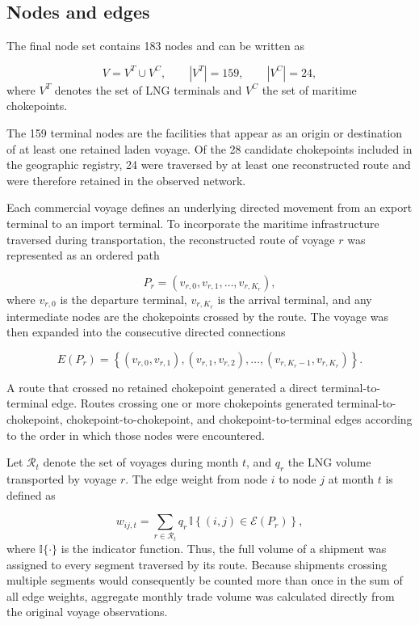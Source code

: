\documentclass[pdftex,12pt,openright,a4paper,oneside]{book}
\begin{document}
\subsection{Nodes and edges} 
\label{subsec:nodes_edges} 
The final node set contains 183 nodes and can be written as 

\begin{equation*} 
    V = V^{T} \cup V^{C}, \qquad |V^{T}|=159, \qquad |V^{C}|=24, 
\end{equation*}
where \(V^{T}\) denotes the set of LNG terminals and \(V^{C}\) the set of maritime chokepoints. 

The 159 terminal nodes are the facilities that appear as an origin or destination of at least one retained laden voyage. 
Of the 28 candidate chokepoints included in the geographic registry, 24 were traversed by at least one reconstructed route and were therefore retained in the observed network.

Each commercial voyage defines an underlying directed movement from an export terminal to an import terminal. 
To incorporate the maritime infrastructure traversed during transportation, the reconstructed route of voyage \(r\) was represented as an ordered path 

\begin{equation*} 
    P_r = \left( v_{r,0},v_{r,1},\ldots,v_{r,K_r} \right), 
\end{equation*}
where \(v_{r,0}\) is the departure terminal, \(v_{r,K_r}\) is the arrival terminal, and any intermediate nodes are the chokepoints crossed by the route. 
The voyage was then expanded into the consecutive directed connections

\begin{equation*} 
    E(P_r)=\left\{(v_{r,0},v_{r,1}), (v_{r,1},v_{r,2}), \ldots, (v_{r,K_r-1},v_{r,K_r})\right\}. 
\end{equation*} 

A route that crossed no retained chokepoint generated a direct terminal-to-terminal edge. 
Routes crossing one or more chokepoints generated terminal-to-chokepoint, chokepoint-to-chokepoint, and chokepoint-to-terminal edges according to the order in which those nodes were encountered.

Let \(\mathcal{R}_t\) denote the set of voyages during month \(t\), and \(q_r\) the LNG volume transported by voyage \(r\). 
The edge weight from node \(i\) to node \(j\) at month \(t\) is defined as

\begin{equation} 
    w_{ij,t} = \sum_{r\in\mathcal{R}_t} q_r\, 
    \mathbb{I} \left\{ (i,j)\in\mathcal{E}(P_r) \right\}, 
    \label{eq:monthly_edge_weight} 
\end{equation}
where \(\mathbb{I}\{\cdot\}\) is the indicator function. 
Thus, the full volume of a shipment was assigned to every segment traversed by its route.
Because shipments crossing multiple segments would consequently be counted more than once in the sum of all edge weights, aggregate monthly trade volume was calculated directly from the original voyage observations.
\end{document}
